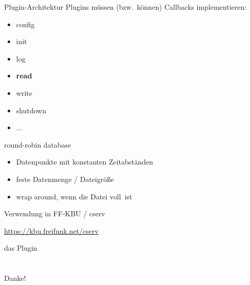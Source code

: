 \documentclass[ngerman,compress,aspectratio=169]{beamer}
\begin{document}
\begin{frame}{Plugin-Architektur}
	Plugins m\"ussen (bzw.\ k\"onnen) Callbacks implementieren:
	\begin{itemize}
		\pause
		\item config
		\pause
		\item init
		\pause
		\item log
		\pause
		\item \textbf{read}
		\pause
		\item write
		\pause
		\item shutdown
		\pause
		\item $\ldots$
	\end{itemize}
\end{frame}

\begin{frame}{round-robin database}
	\begin{itemize}
		\pause
		\item Datenpunkte mit konstanten Zeitabst\"anden
		\pause
		\item feste Datenmenge / Dateigr\"o\ss e
		\pause
		\item \glqq wrap around\grqq, wenn die Datei \glqq voll\grqq\ ist
		\pause
	\end{itemize}
\end{frame}


\begin{frame}{Verwendung in FF-KBU / cserv}
	\begin{center}
		\url{https://kbu.freifunk.net/cserv}
	\end{center}
\end{frame}

\begin{frame}
	\begin{center}
		\large{das Plugin}
	\end{center}
\end{frame}

\section{}

\begin{frame}
	\begin{center}
		\Huge{Danke!}
	\end{center}
\end{frame}
\end{document}
